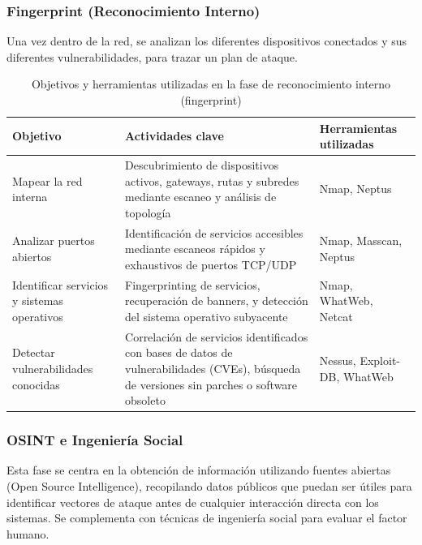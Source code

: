\documentclass[a4paper, 11pt]{article}
\begin{document}
\subsubsection{Fingerprint (Reconocimiento Interno)}

Una vez dentro de la red, se analizan los diferentes dispositivos conectados y sus diferentes vulnerabilidades, para trazar un plan de ataque.

\begin{table}[H]
\centering
\renewcommand{\arraystretch}{1.4}
\begin{tabular}{|p{4.2cm}|p{7.2cm}|p{3.6cm}|}
\hline
\textbf{Objetivo} & \textbf{Actividades clave} & \textbf{Herramientas utilizadas} \\
\hline
Mapear la red interna & Descubrimiento de dispositivos activos, gateways, rutas y subredes mediante escaneo y análisis de topología & Nmap, Neptus \\
\hline
Analizar puertos abiertos & Identificación de servicios accesibles mediante escaneos rápidos y exhaustivos de puertos TCP/UDP & Nmap, Masscan, Neptus \\
\hline
Identificar servicios y sistemas operativos & Fingerprinting de servicios, recuperación de banners, y detección del sistema operativo subyacente & Nmap, WhatWeb, Netcat \\
\hline
Detectar vulnerabilidades conocidas & Correlación de servicios identificados con bases de datos de vulnerabilidades (CVEs), búsqueda de versiones sin parches o software obsoleto & Nessus, Exploit-DB, WhatWeb \\
\hline
\end{tabular}
\caption{Objetivos y herramientas utilizadas en la fase de reconocimiento interno (fingerprint)}
\label{tab:fingerprint_interno}
\end{table}





\subsubsection{OSINT e Ingeniería Social}

Esta fase se centra en la obtención de información utilizando fuentes abiertas (Open Source Intelligence), recopilando datos públicos que puedan ser útiles para identificar vectores de ataque antes de cualquier interacción directa con los sistemas. Se complementa con técnicas de ingeniería social para evaluar el factor humano.
\end{document}
